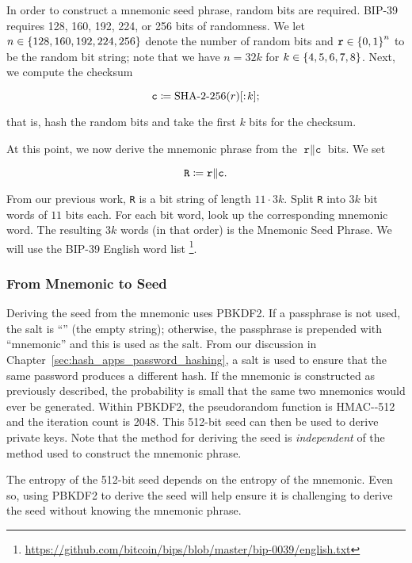 In order to construct a mnemonic seed phrase, random bits are required.
BIP-39 requires 128, 160, 192, 224, or 256 bits of randomness.
We let $n\in\left\{ 128, 160, 192, 224, 256 \right\}$ denote the number
of random bits and $\texttt{r}\in\left\{ 0,1 \right\}^{n}$ to be the random bit string;
note that we have $n = 32k$ for $k\in\left\{ 4,5,6,7,8 \right\}$.
Next, we compute the checksum

\begin{equation}
    \texttt{c} \mathDef{} \text{\ShaTwo{}-256}(r)[:\!k];
\end{equation}

\noindent
that is, hash the random bits and take the first $k$ bits for the checksum.

At this point, we now derive the mnemonic phrase from the
$\texttt{r}\|\texttt{c}$ bits.
We set

\begin{equation}
    \texttt{R} \coloneqq{} \texttt{r}\|\texttt{c}.
\end{equation}

\noindent
From our previous work, \texttt{R} is a bit string of length $11\cdot3k$.
Split \texttt{R} into $3k$ bit words of $11$ bits each.
For each bit word, look up the corresponding mnemonic word.
The resulting $3k$ words (in that order) is the Mnemonic Seed Phrase.
We will use the BIP-39 English word list%
\footnote{\url{https://github.com/bitcoin/bips/blob/master/bip-0039/english.txt}}.

\subsubsection{From Mnemonic to Seed}

Deriving the seed from the mnemonic uses PBKDF2.
If a passphrase is not used, the \gls{salt} is ``'' (the empty string);
otherwise, the passphrase is prepended with ``mnemonic'' and
this is used as the \gls{salt}.
From our discussion in Chapter~\ref{sec:hash_apps_password_hashing},
a \gls{salt} is used to ensure that the same password produces
a different hash.
If the mnemonic is constructed as previously described,
the probability is small that the same two mnemonics would ever be generated.
Within PBKDF2, the pseudorandom function is HMAC-\ShaTwo{}-512
and the iteration count is 2048.
This 512-bit seed can then be used to derive private keys.
Note that the method for deriving the seed is \emph{independent}
of the method used to construct the mnemonic phrase.

The entropy of the 512-bit seed depends on the entropy of the mnemonic.
Even so, using PBKDF2 to derive the seed will help ensure
it is challenging to derive the seed without knowing the mnemonic phrase.

